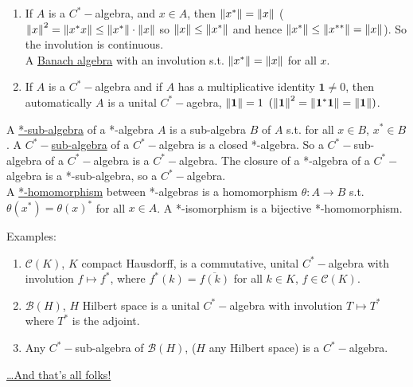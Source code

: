 \documentclass{article}
\begin{document}
\begin{remark}
    \begin{enumerate}
        \item If $A$ is a $C^*-$algebra, and $x\in A$, then $\left\lVert x^*\right\rVert=\left\lVert x\right\rVert$ ($\left\lVert x\right\rVert^2=\left\lVert x^*x\right\rVert\leq \left\lVert x^*\right\rVert\cdot\left\lVert x\right\rVert$ so $\left\lVert x\right\rVert\leq \left\lVert x^*\right\rVert$ and hence $\left\lVert x^*\right\rVert\leq \left\lVert x^{**}\right\rVert=\left\lVert x\right\rVert$). So the involution is continuous.\\

        A \noindent\underline{Banach algebra} with an involution s.t. $\left\lVert x^*\right\rVert=\left\lVert x\right\rVert$ for all $x$.
        \item If $A$ is a $C^*-$algebra and if $A$ has a multiplicative identity $\mathbf{1}\neq 0$, then automatically $A$ is a unital $C^*-$agebra, $\left\lVert\mathbf{1}\right\rVert=1$ $(\left\lVert\mathbf{1}\right\rVert^2 = \left\lVert\mathbf{1}^*\mathbf{1}\right\rVert=\left\lVert\mathbf{1}\right\rVert)$.
    \end{enumerate}
\end{remark}

\begin{boxdef}\label{def:*-subalg}
    A \noindent\underline{*-sub-algebra} of a *-algebra $A$ is a sub-algebra $B$ of $A$ s.t. for all $x\in B$, $x^*\in B$. A \noindent\underline{$C^*-$sub-algebra} of a $C^*-$algebra is a closed *-algebra. So a $C^*-$sub-algebra of a $C^*-$algebra is a $C^*-$algebra. 
    The closure of a *-algebra of a $C^*-$algebra is a *-sub-algebra, so a $C^*-$algebra.\\

    A \noindent\underline{*-homomorphism} between *-algebras is a homomorphism $\theta:A\to B$ s.t. $\theta(x^*) = \theta(x)^*$ for all $x\in A$. A *-isomorphism is a bijective *-homomorphism.
\end{boxdef}

\begin{examplesblock}{Examples:}\label{examples: 13}
    \begin{enumerate}
        \item $\mathcal{C}(K)$, $K$ compact Hausdorff, is a commutative, unital $C^*-$algebra with involution $f\mapsto f^*$, where $f^*(k) = \overline{f(k)}$ for all $k\in K$, $f\in \mathcal{C}(K)$.
        \item $\mathcal{B}(H)$, $H$ Hilbert space is a unital $C^*-$algebra with involution $T\mapsto T^*$ where $T^*$ is the adjoint. 
        \item Any $C^*-$sub-algebra of $\mathcal{B}(H)$, ($H$ any Hilbert space) is a $C^*-$algebra.
    \end{enumerate}
    \noindent\underline{\ldots And that's all folks!}
\end{examplesblock}
\end{document}
